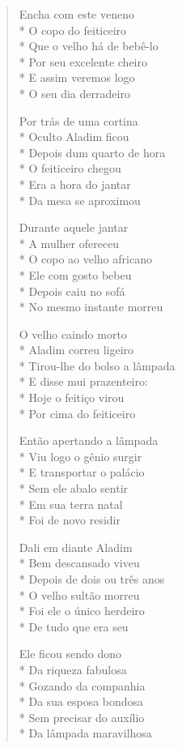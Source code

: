 \begin{verse}
Encha com este veneno\\*
O copo do feiticeiro\\*
Que o velho há de bebê-lo\\*
Por seu excelente cheiro\\*
E assim veremos logo\\*
O seu dia derradeiro

Por trás de uma cortina\\*
Oculto Aladim ficou\\*
Depois dum quarto de hora\\*
O feiticeiro chegou\\*
Era a hora do jantar\\*
Da mesa se aproximou

Durante aquele jantar\\*
A mulher ofereceu\\*
O copo ao velho africano\\*
Ele com gosto bebeu\\*
Depois caiu no sofá\\*
No mesmo instante morreu

O velho caindo morto\\*
Aladim correu ligeiro\\*
Tirou-lhe do bolso a lâmpada\\*
E disse mui prazenteiro:\\*
Hoje o feitiço virou\\*
Por cima do feiticeiro

Então apertando a lâmpada\\*
Viu logo o gênio surgir\\*
E transportar o palácio\\*
Sem ele abalo sentir\\*
Em sua terra natal\\*
Foi de novo residir

Dali em diante Aladim\\*
Bem descansado viveu\\*
Depois de dois ou três anos\\*
O velho sultão morreu\\*
Foi ele o único herdeiro\\*
De tudo que era seu

Ele ficou sendo dono\\*
Da riqueza fabulosa\\*
Gozando da companhia\\*
Da sua esposa bondosa\\*
Sem precisar do auxílio\\*
Da lâmpada maravilhosa


\end{verse}
